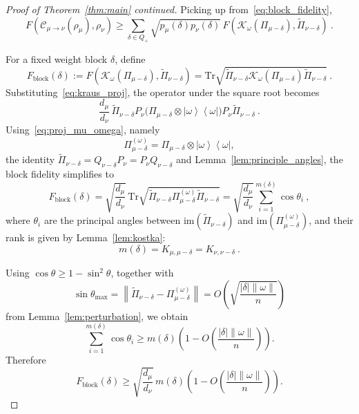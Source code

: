 \documentclass[a4paper,onecolumn,11pt]{quantumarticle}
\newcommand{\ketbra}[2]{\left|#1\right\rangle\!\!\left\langle #2\right|}
\newcommand*{\Tr}{\mathrm{Tr}}
\def\C{\mathcal{C}}
\begin{document}
\begin{proof}[Proof of Theorem~\ref{thm:main} continued]
Picking up from~\eqref{eq:block_fidelity},
\begin{equation}
    F(\C_{\mu\to\nu}(\rho_\mu),\rho_\nu)
    \ge
    \sum_{\delta\in Q_+}
    \sqrt{p_\mu(\delta)p_\nu(\delta)}\,
    F(\mathcal K_\omega(\Pi_{\mu-\delta}),\widetilde{\Pi}_{\nu-\delta}) \ .
\end{equation}

For a fixed weight block \(\delta\), define
\begin{equation}
    F_{\mathrm{block}}(\delta)
    :=
    F(\mathcal K_\omega(\Pi_{\mu-\delta}),\widetilde{\Pi}_{\nu-\delta})
    =
    \Tr\sqrt{
        \widetilde{\Pi}_{\nu-\delta}
        \mathcal K_\omega(\Pi_{\mu-\delta})
        \widetilde{\Pi}_{\nu-\delta}
    } \ .
\end{equation}
Substituting~\eqref{eq:kraus_proj}, the operator under the square root becomes
\begin{equation}
    \frac{d_\mu}{d_\nu}\,
    \widetilde{\Pi}_{\nu-\delta}
    P_\nu
    \bigl(\Pi_{\mu-\delta}\otimes \ketbra{\omega}{\omega}\bigr)
    P_\nu
    \widetilde{\Pi}_{\nu-\delta}\ .
\end{equation}
Using~\eqref{eq:proj_mu_omega}, namely
\[
\Pi_{\mu-\delta}^{(\omega)} =
\Pi_{\mu-\delta}\otimes \ketbra{\omega}{\omega},
\]
the identity \(\widetilde{\Pi}_{\nu-\delta}=Q_{\nu-\delta}P_\nu=P_\nu Q_{\nu-\delta}\) and Lemma~\ref{lem:principle_angles}, the block fidelity simplifies to
\begin{equation}
    F_{\mathrm{block}}(\delta)
    =
    \sqrt{\frac{d_\mu}{d_\nu}}\,
    \Tr\sqrt{
        \widetilde{\Pi}_{\nu-\delta}
        \Pi_{\mu-\delta}^{(\omega)}
        \widetilde{\Pi}_{\nu-\delta}
    }
    =
    \sqrt{\frac{d_\mu}{d_\nu}}
    \sum_{i=1}^{m(\delta)} \cos\theta_i\ ,
\end{equation}
where \(\theta_i\) are the principal angles between
\(\mathrm{im}(\widetilde{\Pi}_{\nu-\delta})\) and
\(\mathrm{im}(\Pi_{\mu-\delta}^{(\omega)})\), and their rank is given by Lemma~\ref{lem:kostka}:
\[
m(\delta)=K_{\mu,\mu-\delta}=K_{\nu,\nu-\delta}\ .
\]

Using \(\cos\theta\ge 1-\sin^2\theta\), together with
\begin{equation}
    \sin\theta_{\max}=
    \left\|\widetilde{\Pi}_{\nu-\delta}-\Pi_{\mu-\delta}^{(\omega)}\right\|=
    O\!\left(\sqrt{\frac{|\delta|\|\omega\|}{n}}\right)
\end{equation}
from Lemma~\ref{lem:perturbation}, we obtain
\begin{equation}
    \sum_{i=1}^{m(\delta)} \cos\theta_i \ge
    m(\delta)\left(
        1-O\!\left(\frac{|\delta|\|\omega\|}{n}\right)
    \right).
\end{equation}
Therefore
\begin{equation}
    F_{\mathrm{block}}(\delta) \ge
    \sqrt{\frac{d_\mu}{d_\nu}}\,
    m(\delta)\left(
        1-O\!\left(\frac{|\delta|\|\omega\|}{n}\right)
    \right).
\end{equation}


\end{proof}
\end{document}
